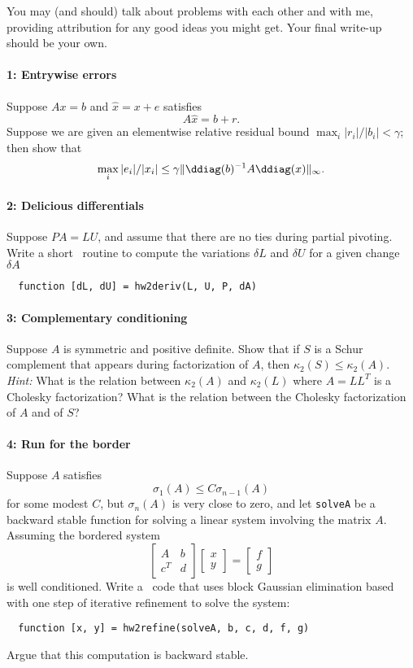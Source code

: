 \documentclass[12pt, leqno]{article} %
\begin{document}

You may (and should) talk about problems with each other and with me,
providing attribution for any good ideas you might get.  Your final
write-up should be your own.

\paragraph*{1: Entrywise errors}
Suppose $Ax = b$ and $\hat{x} = x + e$ satisfies
\[
  A \hat{x} = b + r.
\]
Suppose we are given an elementwise relative residual bound
$\max_i |r_i|/|b_i| < \gamma$; then show that
\[
  \max_i |e_i|/|x_i| \leq
  \gamma \|\ddiag(b)^{-1} A \ddiag(x)\|_\infty.
\]

\paragraph*{2: Delicious differentials}
Suppose $PA = LU$, and assume that there are no ties during partial
pivoting.  Write a short \matlab\ routine to compute the variations
$\delta L$ and $\delta U$ for a given change $\delta A$
\begin{lstlisting}
  function [dL, dU] = hw2deriv(L, U, P, dA)
\end{lstlisting}

\paragraph*{3: Complementary conditioning}
Suppose $A$ is symmetric and positive definite.  Show that if $S$
is a Schur complement that appears during factorization of $A$,
then $\kappa_2(S) \leq \kappa_2(A)$.  {\em Hint:} What is the
relation between $\kappa_2(A)$ and $\kappa_2(L)$ where $A = LL^T$
is a Cholesky factorization?  What is the relation between the
Cholesky factorization of $A$ and of $S$?

\paragraph*{4: Run for the border}
Suppose $A$ satisfies
\[
  \sigma_1(A) \leq C \sigma_{n-1}(A)
\]
for some modest $C$, but $\sigma_n(A)$ is very close to zero,
and let {\tt solveA} be a backward stable function for solving
a linear system involving the matrix $A$.  Assuming the bordered
system
\[
  \begin{bmatrix} A & b \\ c^T & d \end{bmatrix}
  \begin{bmatrix} x \\ y \end{bmatrix} =
  \begin{bmatrix} f \\ g \end{bmatrix}
\]
is well conditioned.  Write a \matlab\ code that uses
block Gaussian elimination based with one
step of iterative refinement to solve the system:
\begin{lstlisting}
  function [x, y] = hw2refine(solveA, b, c, d, f, g)
\end{lstlisting}
Argue that this computation is backward stable.
\end{document}
